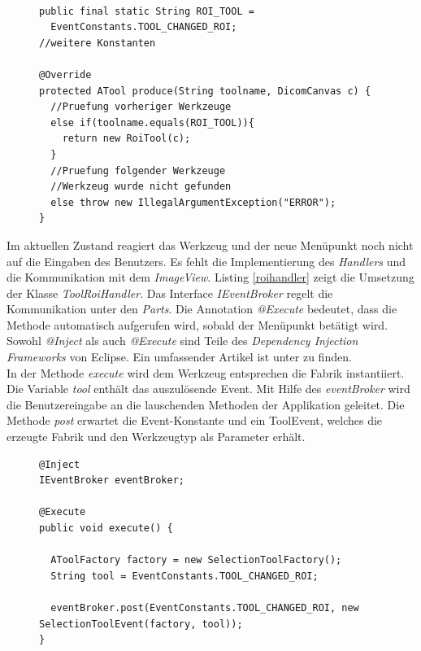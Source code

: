 \begin{figure}[htbp]
\begin{lstlisting}[frame=leftline]

public final static String ROI_TOOL = 
  EventConstants.TOOL_CHANGED_ROI;
//weitere Konstanten

@Override
protected ATool produce(String toolname, DicomCanvas c) {
  //Pruefung vorheriger Werkzeuge
  else if(toolname.equals(ROI_TOOL)){
    return new RoiTool(c);
  }
  //Pruefung folgender Werkzeuge
  //Werkzeug wurde nicht gefunden
  else throw new IllegalArgumentException("ERROR");
}
\end{lstlisting}
\end{figure}

Im aktuellen Zustand reagiert das Werkzeug und der neue Menüpunkt noch nicht auf die Eingaben des Benutzers. Es fehlt die Implementierung des \textit{Handlers} und die Kommunikation mit dem \textit{ImageView}. Listing \ref{roihandler} zeigt die Umsetzung der Klasse \textit{ToolRoiHandler}. Das Interface \textit{IEventBroker} regelt die Kommunikation unter den \textit{Parts}. Die Annotation \textit{@Execute} bedeutet, dass die Methode automatisch aufgerufen wird, sobald der Menüpunkt betätigt wird. Sowohl \textit{@Inject} als auch \textit{@Execute} sind Teile des \textit{Dependency Injection Frameworks} von Eclipse. Ein umfassender Artikel ist unter \cite{vogel:di} zu finden.\\
In der Methode \textit{execute} wird dem Werkzeug entsprechen die Fabrik instantiiert. Die Variable \textit{tool} enthält das auszulösende Event. Mit Hilfe des \textit{eventBroker} wird die Benutzereingabe an die lauschenden Methoden der Applikation geleitet. Die Methode \textit{post} erwartet die Event-Konstante und ein ToolEvent, welches die erzeugte Fabrik und den Werkzeugtyp als Parameter erhält.

\begin{figure}[htbp]
\begin{lstlisting}[frame=leftline]
@Inject
IEventBroker eventBroker;

@Execute
public void execute() {

  AToolFactory factory = new SelectionToolFactory();
  String tool = EventConstants.TOOL_CHANGED_ROI;

  eventBroker.post(EventConstants.TOOL_CHANGED_ROI, new SelectionToolEvent(factory, tool));
}
\end{lstlisting}
\end{figure}

